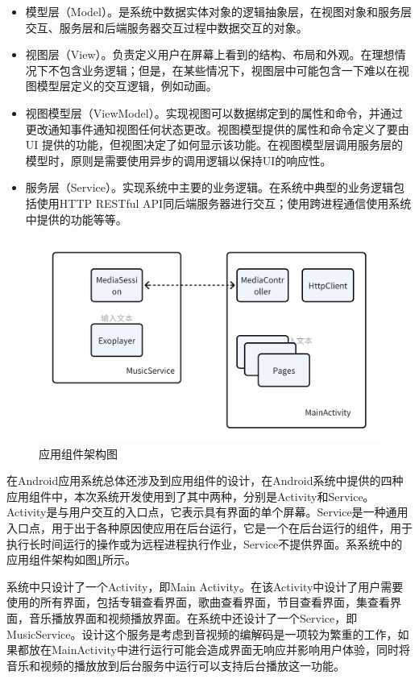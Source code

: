 \documentclass[main.tex]{subfiles}
\begin{document}
\begin{itemize}
    \item 模型层（Model）。是系统中数据实体对象的逻辑抽象层，在视图对象和服务层交互、服务层和后端服务器交互过程中数据交互的对象。
    \item 视图层（View）。负责定义用户在屏幕上看到的结构、布局和外观。在理想情况下不包含业务逻辑；但是，在某些情况下，视图层中可能包含一下难以在视图模型层定义的交互逻辑，例如动画。
    \item 视图模型层（ViewModel）。实现视图可以数据绑定到的属性和命令，并通过更改通知事件通知视图任何状态更改。视图模型提供的属性和命令定义了要由 UI 提供的功能，但视图决定了如何显示该功能。在视图模型层调用服务层的模型时，原则是需要使用异步的调用逻辑以保持UI的响应性。
    \item 服务层（Service）。实现系统中主要的业务逻辑。在系统中典型的业务逻辑包括使用HTTP RESTful API同后端服务器进行交互；使用跨进程通信使用系统中提供的功能等等。 
\end{itemize}

\begin{figure}[htbp]
    \centering
    \includegraphics[width=0.8\linewidth]{assets/components.png}
    \caption{应用组件架构图}
    \label{fig:components}
\end{figure}

在Android应用系统总体还涉及到应用组件的设计，在Android系统中提供的四种应用组件中，本次系统开发使用到了其中两种，分别是Activity和Service。Activity是与用户交互的入口点，它表示具有界面的单个屏幕。Service是一种通用入口点，用于出于各种原因使应用在后台运行，它是一个在后台运行的组件，用于执行长时间运行的操作或为远程进程执行作业，Service不提供界面。系系统中的应用组件架构如图\ref{fig:components}所示。

系统中只设计了一个Activity，即Main Activity。在该Activity中设计了用户需要使用的所有界面，包括专辑查看界面，歌曲查看界面，节目查看界面，集查看界面，音乐播放界面和视频播放界面。在系统中还设计了一个Service，即MusicService。设计这个服务是考虑到音视频的编解码是一项较为繁重的工作，如果都放在MainActivity中进行运行可能会造成界面无响应并影响用户体验，同时将音乐和视频的播放放到后台服务中运行可以支持后台播放这一功能。
\end{document}
